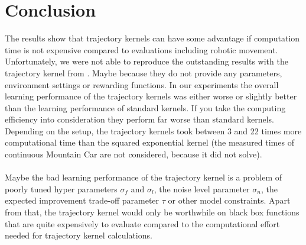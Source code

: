 \section{Conclusion}

The results show that trajectory kernels can have some advantage if computation time is not expensive compared to evaluations including robotic movement.
Unfortunately, we were not able to reproduce the outstanding results with the trajectory kernel from \cite{wilson2014using}. Maybe because they do not provide any parameters, environment settings or rewarding functions. In our experiments the overall learning performance of the trajectory kernels was either worse or slightly better than the learning performance of standard kernels. If you take the computing efficiency into consideration they perform far worse than standard kernels. Depending on the setup, the trajectory kernels took between 3 and 22 times more computational time than the squared exponential kernel (the measured times of continuous Mountain Car are not considered, because it did not solve).\\
\\
Maybe the bad learning performance of the trajectory kernel is a problem of poorly tuned hyper parameters $\sigma_f$ and $\sigma_l$, the noise level parameter $\sigma_n$, the expected improvement trade-off parameter $\tau$ or other model constraints. Apart from that, the trajectory kernel would only be worthwhile on black box functions that are quite expensively to evaluate compared to the computational effort needed for trajectory kernel calculations.
